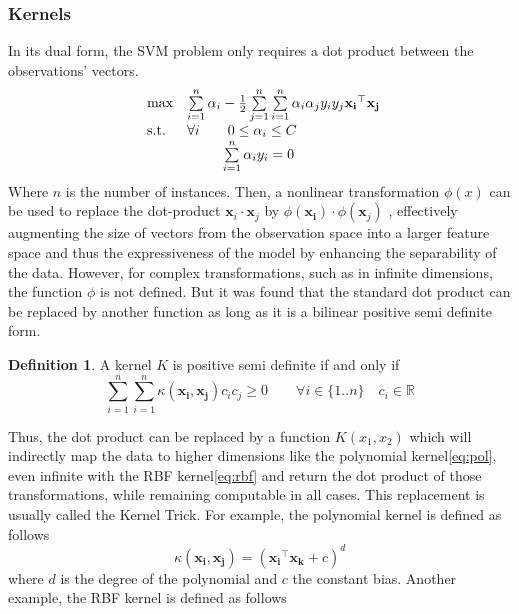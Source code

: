 \documentclass{article}
\let\vec\mathbf
\newcommand*{\R}{%
  \mathbb{R}%
}
\theoremstyle{definition}
\newtheorem{definition}{Definition}
\begin{document}
\subsubsection{Kernels}
In its dual form, the SVM problem only requires a dot product between the observations' vectors. 
\begin{equation}
	\begin{array}{ll@{}ll}
	\text{max} & \sum\limits_{i=1}^{n} \alpha_i - \frac{1}{2} \sum\limits_{j=1}^{n}\sum\limits_{i=1}^{n}\alpha_{i}\alpha_{j}y_{i}y_{j}\vec{x_{i}}^{\top}\vec{x_{j}}\\
	\text{s.t.} & \forall i\qquad 0 \leq \alpha_{i} \leq C\\
	& \qquad \;\; \sum\limits_{i=1}^{n} \alpha_{i}y_{i}=0
	\end{array}
\end{equation}
Where $n$ is the number of instances.
Then, a nonlinear transformation $\phi(x)$ can be used to replace the dot-product $\vec{x}_i \cdot \vec{x}_j$ by $\phi(\vec{x_{i}})\cdot\phi(\vec{x}_{j})$ , effectively augmenting the size of vectors from the observation space into a larger feature space and thus the expressiveness of the model by enhancing the separability of the data. However, for complex transformations, such as in infinite dimensions, the function $\phi$ is not defined. But it was found that the standard dot product can be replaced by another function as long as it is a bilinear positive semi definite form. 
\begin{definition}
	A kernel $K$ is positive semi definite if and only if\\
    \begin{equation}
    	\sum\limits_{i=1}^{n}\sum\limits_{i=1}^{n}\kappa(\vec{x_{i}},\vec{x_{j}})c_{i}c_{j} \geq 0 \qquad \forall i \in \{1..n\} \quad c_i \in \R
    \end{equation}
\end{definition}
Thus, the dot product can be replaced by a function $K(x_1,x_2)$ which will indirectly map the data to higher dimensions like the polynomial kernel\ref{eq:pol}, even infinite with the RBF kernel\ref{eq:rbf} and return the dot product of those transformations, while remaining computable in all cases. This replacement is usually called the Kernel Trick. For example, the polynomial kernel is defined as follows
\begin{equation}
	\label{eq:pol}
	\kappa(\vec{x_{i}},\vec{x_{j}})=(\vec{x_{i}}^{\top}\vec{x_{k}}+c)^d
\end{equation}
where $d$ is the degree of the polynomial and $c$ the constant bias. Another example, the RBF kernel is defined as follows
\end{document}
